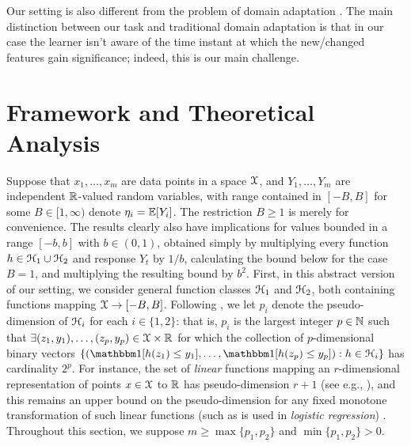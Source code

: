 \documentclass{article}
\newcommand{\eat}[1]{}
\begin{document}
Our setting is also different from the problem of domain adaptation \cite{da1}. The main distinction between our task
and traditional domain adaptation is that in our case the learner isn't aware of the time instant at which the new/changed features gain significance; indeed, this is our main challenge.

\section{Framework and Theoretical Analysis}
\label{sec:theory}

Suppose that $x_{1},\ldots,x_{m}$ are data points in a space $\mathcal X$, and
$Y_{1},\ldots,Y_{m}$ are independent $\mathbb{R}$-valued random variables,
with range contained in $[-B,B]$ for some $B \in [1,\infty)$
denote $\eta_{i} = \mathbb{E}[Y_{i}]$. The restriction $B \geq 1$ is merely 
for convenience.  The results clearly also have implications for values bounded in a range $[-b,b]$ with $b \in (0,1)$,
obtained simply by multiplying every function $h \in \mathcal H_{1} \cup \mathcal H_{2}$ and response $Y_{t}$
by $1/b$, calculating the bound below for the case $B=1$,
and multiplying the resulting bound by $b^{2}$.
First, in this abstract version of our setting, we consider general
function classes $\mathcal H_{1}$ and $\mathcal H_{2}$, both containing functions
mapping $\mathcal X \to [-B,B]$.  
%
Following \cite{pollard:84,pollard:90,anthony:99}, we let
$p_{i}$ denote the pseudo-dimension of
$\mathcal H_{i}$ for each $i \in \{1,2\}$: that is, 
$p_{i}$ is the largest integer $p \in \mathbb{N}$ such that 
$\exists (z_{1},y_{1}),\ldots,(z_{p},y_{p}) \in \mathcal X \times \mathbb{R}$ for which 
the collection of $p$-dimensional binary vectors
$\{ (\ind[h(z_{1}) \leq y_{1}],\ldots,\ind[h(z_{p}) \leq y_{p}]) : h \in \H_{i} \}$ has cardinality $2^{p}$.
For instance, the set of \emph{linear} functions mapping an $r$-dimensional
representation of points $x \in \mathcal X$ to $\mathbb{R}$ has pseudo-dimension $r+1$ (see e.g., \cite{anthony:99}),
and this remains an upper bound on the pseudo-dimension for any fixed monotone transformation
of such linear functions (such as is used in \emph{logistic regression}) \cite{anthony:99}.
Throughout this section, we suppose $m \geq \max\{p_{1},p_{2}\}$ and $\min\{p_{1},p_{2}\} > 0$.
\eat{The supplemental material (section 7) includes an extension of this theory to allow for spaces with 
infinite pseudo-dimension; the extension introduces additional technical complexity
to the arguments and theorems, but the essential ideas are basically the same as those 
used in the simpler case here.}
\end{document}
